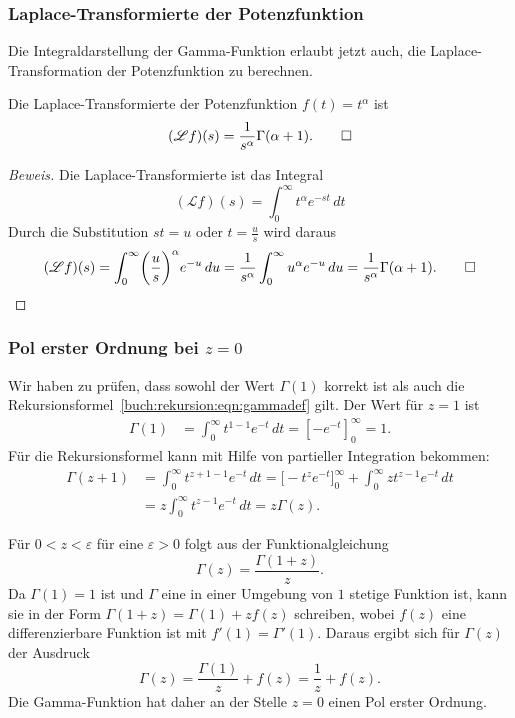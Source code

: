 \subsubsection{Laplace-Transformierte der Potenzfunktion}
Die Integraldarstellung der Gamma-Funktion erlaubt jetzt auch, die
Laplace-Transformation der Potenzfunktion zu berechnen.
%

\begin{satz}
%
Die Laplace-Transformierte der Potenzfunktion $f(t)=t^\alpha$ ist
\[
(\mathscr{L}f)(s)
=
\frac{1}{s^\alpha} \Gamma(\alpha+1).
\qedhere
\]
\end{satz}

\begin{proof}[Beweis]
Die Laplace-Transformierte ist das Integral
\[
(\mathscr{L}f)(s)
=
\int_0^\infty t^\alpha e^{-st}\,dt
\]
Durch die Substitution $st = u$ oder $t=\frac{u}{s}$ wird daraus
\[
(\mathscr{L}f)(s)
=
\int_0^\infty \biggl(\frac{u}{s}\biggr)^\alpha e^{-u}\,du
=
\frac{1}{s^\alpha}\int_0^\infty u^{\alpha} e^{-u}\,du
=
\frac{1}{s^\alpha} \Gamma(\alpha+1).
\qedhere
\]
\end{proof}

%
%
\subsubsection{Pol erster Ordnung bei $z=0$}
%
Wir haben zu prüfen, dass sowohl der Wert $\Gamma(1)$ korrekt ist als
auch die Rekursionsformel~\eqref{buch:rekursion:eqn:gammadef} gilt.
Der Wert für $z=1$ ist
\begin{align*}
\Gamma(1)
&=
\int_0^\infty t^{1-1}e^{-t}\,dt
=
\left[ -e^{-t} \right]_0^\infty
=
1.
\end{align*}
Für die Rekursionsformel kann mit Hilfe von partieller Integration
bekommen:
\begin{align*}
\Gamma(z+1)
&=
\int_0^\infty t^{z+1-1}e^{-t}\,dt
=
\biggl[-t^{z}e^{-t}\biggr]_0^\infty
+
\int_0^\infty z t^{z-1}e^{-t}\,dt
\\
&=
z
\int_0^\infty
t^{z-1}e^{-t}\,dt
=
z \Gamma(z).
\end{align*}

Für $0<z<\varepsilon$ für eine $\varepsilon >0$ folgt aus der 
Funktionalgleichung
\[
\Gamma(z) = \frac{\Gamma(1+z)}{z}.
\]
Da $\Gamma(1)=1$ ist und $\Gamma$ eine in einer
Umgebung von $1$ stetige Funktion ist, kann sie in der Form
\(
\Gamma(1+z)=\Gamma(1) + zf(z)
\)
schreiben, wobei  $f(z)$ eine differenzierbare Funktion ist mit
$f'(1)=\Gamma'(1)$.
Daraus ergibt sich für $\Gamma(z)$ der Ausdruck
\[
\Gamma(z) = \frac{\Gamma(1)}{z} + f(z) = \frac{1}{z} + f(z).
\]
Die Gamma-Funktion hat daher an der Stelle $z=0$ einen Pol erster Ordnung.

